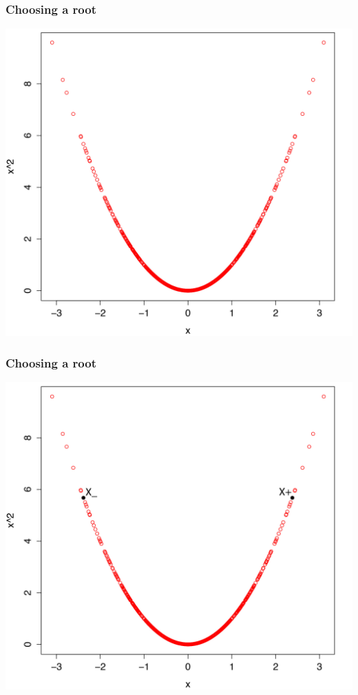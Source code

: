 \documentclass{beamer}
\begin{document}
\begin{frame}
  \frametitle{Choosing a root}
  \vspace{-.05 in} %
  \centering
\includegraphics[scale=.45]{Chooseroots1.pdf}
 \end{frame}
 
\begin{frame}
  \frametitle{Choosing a root}
  \vspace{-.05 in} %
  \centering
\includegraphics[scale=.45]{Chooseroots2.pdf}
 \end{frame}
 
\end{document}
